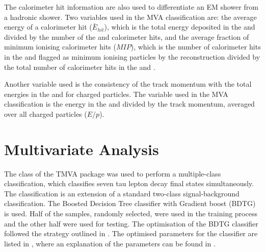 The calorimeter hit information are also used to  differentiate an EM shower from a hadronic shower. Two variables used in the MVA classification are: the average energy of a calorimeter hit ($\bar{E}_{hit}$), which is the total energy deposited in the \ECAL and \HCAL divided by the number of the \ECAL and \HCAL calorimeter hits, and the average fraction of minimum ionising calorimeter hits ($MIP$), which is the number of calorimeter hits in the \ECAL and \HCAL flagged as minimum ionising particles by the \pandora reconstruction divided by the total number of calorimeter hits in the \ECAL and \HCAL.

Another variable used is the consistency of the track momentum with the total energies in the \ECAL and \HCAL for charged particles. The variable used in the MVA classification is the energy in the \ECAL and \HCAL divided by the track momentum, averaged over all charged particles ($E/p$).









\section{Multivariate Analysis}
\label{sec:tauMVA}

The \multiclass class of the TMVA package \cite{Therhaag:2009dp} was used to perform a multiple-class classification, which classifies seven tau lepton decay final states simultaneously. The \multiclass classification is an extension of a standard two-class signal-background classification. The Boosted Decision Tree classifier with Gradient boost (BDTG) is used. Half of the samples, randomly selected, were used in the training process and the other half were used for testing. The optimisation of the BDTG classifier followed the strategy outlined in . The optimised parameters for the classifier are listed in , where an explanation of the parameters can be found in .


